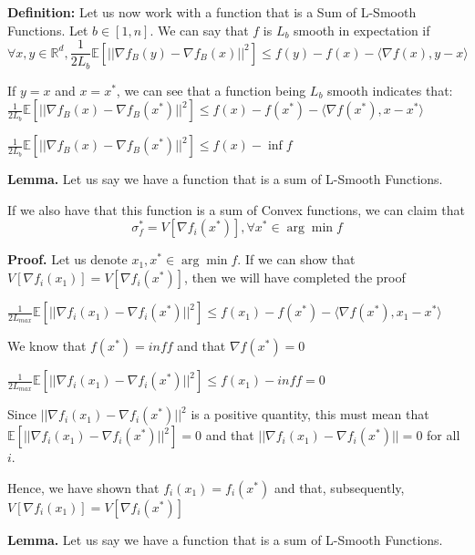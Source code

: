 \noindent \textbf{Definition:} Let us now work with a function that is a Sum of L-Smooth Functions. Let $b \in [1, n]$. We can say that $f$ is $L_b$ smooth in expectation if 
\begin{equation}
    \forall x, y \in \mathbb{R}^d, \frac{1}{2L_b} \mathbb{E}[||\nabla f_B(y) - \nabla f_B(x)||^2] \leq f(y) - f(x) - \langle \nabla f(x), y - x \rangle
\end{equation}

If $y = x$ and $x = x^*$, we can see that a function being $L_b$ smooth indicates that: \newline 
$\frac{1}{2L_b} \mathbb{E}[||\nabla f_B(x) - \nabla f_B(x^*)||^2] \leq f(x) - f(x^*) - \langle \nabla f(x^*), x - x^* \rangle$ \newline 

$\frac{1}{2L_b} \mathbb{E}[||\nabla f_B(x) - \nabla f_B(x^*)||^2] \leq f(x) - \inf f$

\noindent \textbf{Lemma.} Let us say we have a function that is a sum of L-Smooth Functions. 

If we also have that this function is a sum of Convex functions, we can claim that 
\begin{equation}
    \sigma_f^* = V[\nabla f_i(x^*)], \forall x^* \in \arg \min f
\end{equation}

\noindent \textbf{Proof.} Let us denote $x_1, x^* \in \arg \min f$. If we can show that $V[\nabla f_i(x_1)] = V[\nabla f_i(x^*)]$, then we will have completed the proof 

$\frac{1}{2L_{max}} \mathbb{E}[||\nabla f_i(x_1) - \nabla f_i(x^*)||^2] \leq f(x_1) - f(x^*) - \langle \nabla f(x^*), x_1 - x^* \rangle$

We know that $f(x^*) = inf f$ and that $\nabla f(x^*) = 0$ \newline 

$\frac{1}{2L_{max}} \mathbb{E}[||\nabla f_i(x_1) - \nabla f_i(x^*)||^2] \leq f(x_1) - inf f = 0$

Since $||\nabla f_i(x_1) - \nabla f_i(x^*)||^2$ is a positive quantity, this must mean that $\mathbb{E}[||\nabla f_i(x_1) - \nabla f_i(x^*)||^2] = 0$ and that $||\nabla f_i(x_1) - \nabla f_i(x^*)|| = 0$ for all $i$. 

Hence, we have shown that $f_i(x_1) = f_i(x^*)$ and that, subsequently, $V[\nabla f_i(x_1)] = V[\nabla f_i(x^*)]$

\noindent \textbf{Lemma.} Let us say we have a function that is a sum of L-Smooth Functions. 

